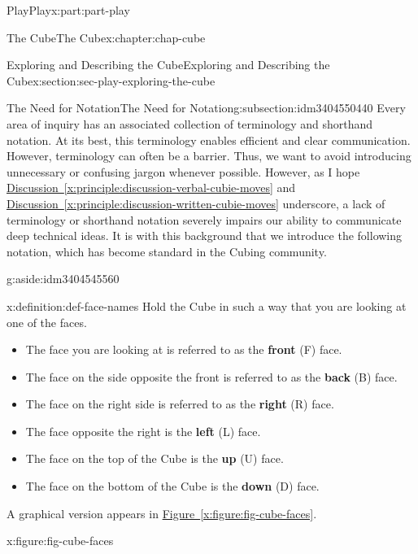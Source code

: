 \documentclass[oneside,10pt,]{book}
\newcommand{\xreffont}{\relax}
\newcommand{\terminology}[1]{\textbf{#1}}
\numberwithin{equation}{section}
\begin{document}
\begin{partptx}{Play}{}{Play}{}{}{x:part:part-play}
\begin{chapterptx}{The Cube}{}{The Cube}{}{}{x:chapter:chap-cube}
\begin{sectionptx}{Exploring and Describing the Cube}{}{Exploring and Describing the Cube}{}{}{x:section:sec-play-exploring-the-cube}
\begin{subsectionptx}{The Need for Notation}{}{The Need for Notation}{}{}{g:subsection:idm3404550440}
Every area of inquiry has an associated collection of terminology and shorthand notation. At its best, this terminology enables efficient and clear communication. However, terminology can often be a barrier. Thus, we want to avoid introducing unnecessary or confusing jargon whenever possible. However, as I hope \hyperref[x:principle:discussion-verbal-cubie-moves]{Discussion~{\xreffont\ref{x:principle:discussion-verbal-cubie-moves}}} and \hyperref[x:principle:discussion-written-cubie-moves]{Discussion~{\xreffont\ref{x:principle:discussion-written-cubie-moves}}} underscore, a lack of terminology or shorthand notation severely impairs our ability to communicate deep technical ideas. It is with this background that we introduce the following notation, which has become standard in the Cubing community.\begin{aside}{}{g:aside:idm3404545560}%
\end{aside}
%
\begin{definition}{}{x:definition:def-face-names}%
Hold the Cube in such a way that you are looking at one of the faces.%
\begin{itemize}[label=\textbullet]
\item{}The face you are looking at is referred to as the \terminology{front} (F) face.%
\item{}The face on the side opposite the front is referred to as the \terminology{back} (B) face.%
\item{}The face on the right side is referred to as the \terminology{right} (R) face.%
\item{}The face opposite the right is the \terminology{left} (L) face.%
\item{}The face on the top of the Cube is the \terminology{up} (U) face.%
\item{}The face on the bottom of the Cube is the \terminology{down} (D) face.%
\end{itemize}
A graphical version appears in \hyperref[x:figure:fig-cube-faces]{Figure~{\xreffont\ref{x:figure:fig-cube-faces}}}.%
\begin{figureptx}{}{x:figure:fig-cube-faces}{}%
\begin{image}{0.25}{0.5}{0.25}%

\end{image}
\end{figureptx}
\end{definition}
\end{subsectionptx}
\end{sectionptx}
\end{chapterptx}
\end{partptx}
\end{document}
